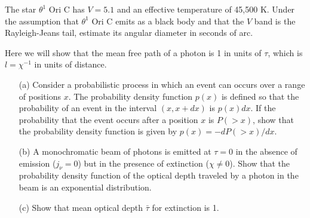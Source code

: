 \begin{problem}
The star $\theta^1$ Ori C has $V = 5.1$ and an effective temperature of 45,500 K. Under the assumption that $\theta^1$ Ori C emits as a black body and that the $V$ band is the Rayleigh-Jeans tail, estimate its angular diameter in seconds of arc.
\end{problem}


\clearpage
\problemset

\begin{problem}
\label{problem-optical-depth}
Here we will show that the mean free path of a photon is
1 in units of $\tau$, which is $l = \chi^{-1}$ in units of distance.
\begin{enumerate}
\item[(a)]
Consider a probabilistic process in which an event can occurs over a range of positions $x$. The probability density function $p(x)$ is defined so that the probability of an event in the interval $(x,x+dx)$ is $p(x)dx$. If the probability that the event occurs after a position $x$ is $P(>\!\!x)$, show that the probability density function is given by $p(x) = -dP(>\!\!x)/dx$.
\item[(b)]
A monochromatic beam of photons is emitted at $\tau = 0$ in the
absence of emission ($j_\nu = 0$) but in the presence of
extinction ($\chi \ne 0$).
Show that the probability density function of the optical depth traveled by a photon in the beam
is an exponential distribution.
\item[(c)]
Show that mean optical depth $\bar\tau$ for extinction is 1.
\end{enumerate}
\end{problem}



